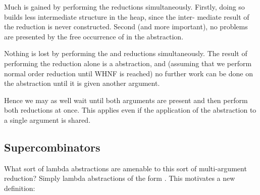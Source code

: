 \begin{numbered}
    \item Much is gained by performing the reductions simultaneously. Firstly,
    doing so builds less intermediate structure in the heap, since the inter-
    mediate result of the  reduction is never constructed. Second (and
    more important), no problems are presented by the free occurrence of 
    in the  abstraction.
    \item Nothing is lost by performing the  and  reductions simultaneously.
    The result of performing the  reduction alone is a  abstraction, and
    (assuming that we perform normal order reduction until WHNF is
    reached) no further work can be done on the  abstraction until it is given
    another argument.

    \phantom{xx}Hence we may as well wait until both arguments are present and then
    perform both reductions at once. This applies even if the application of the
     abstraction to a single argument is shared.
\end{numbered}

\subsection{Supercombinators}

What sort of lambda abstractions are amenable to this sort of multi-argument
reduction? Simply lambda abstractions of the form . This
motivates a new definition:


